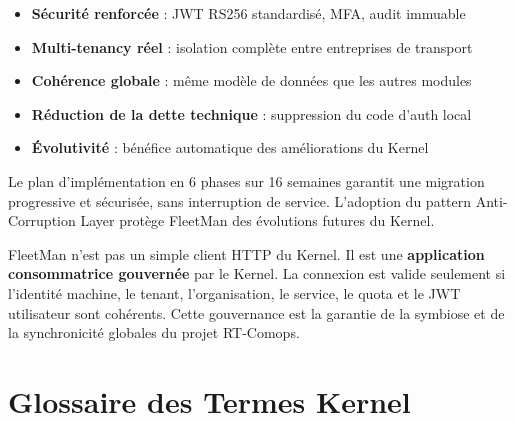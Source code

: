 \documentclass[12pt,a4paper]{report}
\begin{document}
\begin{itemize}[leftmargin=2cm]
  \item \textbf{Sécurité renforcée} : JWT RS256 standardisé, MFA, audit immuable
  \item \textbf{Multi-tenancy réel} : isolation complète entre entreprises de transport
  \item \textbf{Cohérence globale} : même modèle de données que les autres modules
  \item \textbf{Réduction de la dette technique} : suppression du code d'auth local
  \item \textbf{Évolutivité} : bénéfice automatique des améliorations du Kernel
\end{itemize}

Le plan d'implémentation en 6 phases sur 16 semaines garantit une migration
progressive et sécurisée, sans interruption de service. L'adoption du pattern
Anti-Corruption Layer protège FleetMan des évolutions futures du Kernel.

\begin{tcolorbox}[colback=kernellight, colframe=kernelcolor,
                  title={\bfseries\color{white} Message Clé}]
FleetMan n'est pas un simple client HTTP du Kernel. Il est une
\textbf{application consommatrice gouvernée} par le Kernel. La connexion
est valide seulement si l'identité machine, le tenant, l'organisation,
le service, le quota et le JWT utilisateur sont cohérents. Cette gouvernance
est la garantie de la symbiose et de la synchronicité globales du projet
RT-Comops.
\end{tcolorbox}

\appendix

\chapter{Glossaire des Termes Kernel}
\end{document}
